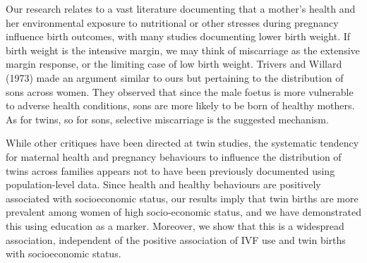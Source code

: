 \documentclass{nature}
\begin{document}
\begin{linenumbers}
Our research relates to a vast literature documenting that a mother's health and her environmental exposure to nutritional or other stresses during pregnancy influence birth outcomes, with many studies documenting lower birth weight\cite{CurrieMoretti2007,Bernsteinetal2005,SerranoDomeque2014}. If birth weight is the intensive margin, we may think of miscarriage as the extensive margin response, or the limiting case of low birth weight. %
Trivers and Willard (1973) made an argument similar to ours but pertaining to the distribution of sons across women. They observed that since the male foetus is more vulnerable to adverse health conditions, sons are more likely to be born of healthy mothers. As for twins, so for sons, selective miscarriage is the suggested mechanism.


While other critiques have been directed at twin studies, the systematic tendency for maternal health and pregnancy behaviours to influence the distribution of twins across families appears not to have been previously documented using population-level data. Since health and healthy behaviours are positively associated with socioeconomic status, our results imply that twin births are more prevalent among women of high socio-economic status, and we have demonstrated this using education as a marker. Moreover, we show that this is a widespread association, independent of the positive association of IVF use and twin births with socioeconomic status.


\end{linenumbers}
\end{document}

